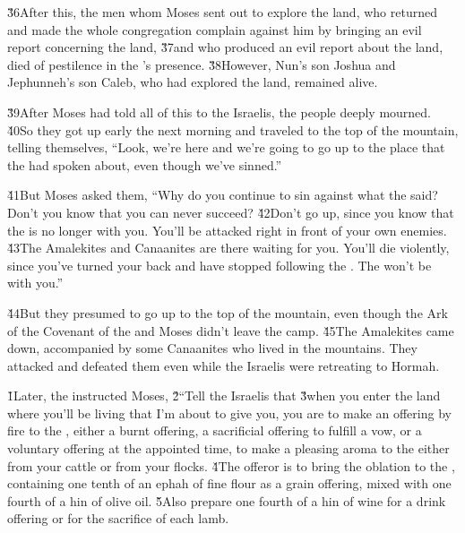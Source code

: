 \v{36}After this, the men whom Moses sent out to explore the land, who returned and made the whole congregation complain against him by bringing an evil report concerning the land, \v{37}and who produced an evil report about the land, died of pestilence in the 's presence. \v{38}However, Nun's son Joshua and Jephunneh's son Caleb, who had explored the land, remained alive.

\v{39}After Moses had told all of this to the Israelis, the people deeply mourned. \v{40}So they got up early the next morning and traveled to the top of the mountain, telling themselves, ``Look, we're here and we're going to go up to the place that the  had spoken about, even though we've sinned.''

\v{41}But Moses asked them, ``Why do you continue to sin against what the  said? Don't you know that you can never succeed? \v{42}Don't go up, since you know that the  is no longer with you. You'll be attacked right in front of your own enemies. \v{43}The Amalekites and Canaanites are there waiting for you. You'll die violently, since you've turned your back and have stopped following the . The  won't be with you.''

\v{44}But they presumed to go up to the top of the mountain, even though the Ark of the Covenant of the  and Moses didn't leave the camp. \v{45}The Amalekites came down, accompanied by some Canaanites who lived in the mountains. They attacked and defeated them even while the Israelis were retreating to Hormah.

\v{1}Later, the  instructed Moses, \v{2}``Tell the Israelis that \v{3}when you enter the land where you'll be living that I'm about to give you, you are to make an offering by fire to the , either a burnt offering, a sacrificial offering to fulfill a vow, or a voluntary offering at the appointed time, to make a pleasing aroma to the  either from your cattle or from your flocks. \v{4}The offeror is to bring the oblation to the , containing one tenth of an ephah of fine flour as a grain offering, mixed with one fourth of a hin of olive oil. \v{5}Also prepare one fourth of a hin of wine for a drink offering or for the sacrifice of each lamb.

